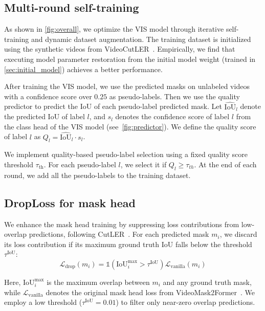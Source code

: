 \subsection{Multi-round self-training}
\label{sec:multi_round_training}

As shown in \cref{fig:overall}, we optimize the VIS model through iterative self-training and dynamic dataset augmentation. The training dataset is initialized using the synthetic videos from VideoCutLER~\cite{videocutler}. Empirically, we find that executing model parameter restoration from the initial model weight (trained in \cref{sec:initial_model}) achieves a better performance.

After training the VIS model, we use the predicted masks on unlabeled videos with a confidence score over $0.25$ as pseudo-labels. Then we use the quality predictor to predict the IoU of each pseudo-label predicted mask. Let $\hat{\text{IoU}}_l$ denote the predicted IoU of label $l$, and $s_l$ denotes the confidence score of label $l$ from the class head of the VIS model (see~\cref{fig:predictor}). We define the quality score of label $l$ as $Q_l = \hat{\text{IoU}}_l \cdot s_l$.

We implement quality-based pseudo-label selection using a fixed quality score threshold $\tau_{\text{th}}$. For each pseudo-label $l$, we select it if $Q_l \geq \tau_{th}$. At the end of each round, we add all the pseudo-labels to the training dataset.


\subsection{DropLoss for mask head}
\label{sec:droploss}

We enhance the mask head training by suppressing loss contributions from low-overlap predictions, following CutLER~\cite{cutler}. For each predicted mask $m_i$, we discard its loss contribution if its maximum ground truth IoU falls below the threshold $\tau^{\text{IoU}}$:
\begin{equation}
    \mathcal{L}_{\text{drop}}(m_i) = \mathds{1}(\text{IoU}_i^{\text{max}} > \tau^{\text{IoU}})\mathcal{L}_{\text{vanilla}}(m_i)
\end{equation}

\noindent Here, $\text{IoU}_i^{\text{max}}$ is the maximum overlap between $m_i$ and any ground truth mask, while $\mathcal{L}_{\text{vanilla}}$ denotes the original mask head loss from VideoMask2Former~\cite{mask2former, videomask2former}. We employ a low threshold ($\tau^{\text{IoU}} = 0.01$) to filter only near-zero overlap predictions.


